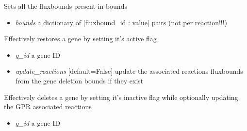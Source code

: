 \documentclass[a4paper,11pt,english]{sphinxmanual}
\begin{document}
\begin{fulllineitems}
\begin{fulllineitems}
\begin{itemize}
\end{itemize}

\end{fulllineitems}


\begin{fulllineitems}
\label{modules_doc:cbmpy.CBModel.Model.setFluxBoundsFromDict}
Sets all the fluxbounds present in bounds
\begin{itemize}
\item {} 
\emph{bounds} a dictionary of {[}fluxbound\_id : value{]} pairs (not per reaction!!!)

\end{itemize}

\end{fulllineitems}


\begin{fulllineitems}
\label{modules_doc:cbmpy.CBModel.Model.setGeneActive}
Effectively restores a gene by setting it's active flag
\begin{itemize}
\item {} 
\emph{g\_id} a gene ID

\item {} 
\emph{update\_reactions} {[}default=False{]} update the associated reactions fluxbounds from the gene deletion bounds if they exist

\end{itemize}

\end{fulllineitems}


\begin{fulllineitems}
\label{modules_doc:cbmpy.CBModel.Model.setGeneInactive}
Effectively deletes a gene by setting it's inactive flag while optionally updating the GPR associated reactions
\begin{itemize}
\item {} 
\emph{g\_id} a gene ID


\end{itemize}
\end{fulllineitems}
\end{fulllineitems}
\end{document}
